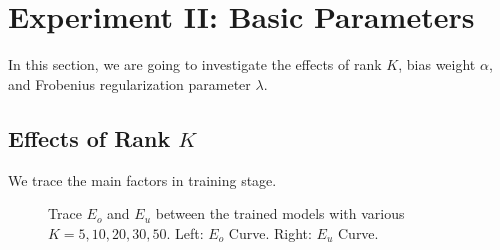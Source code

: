 \documentclass{article} %
\begin{document}
\section{Experiment II: Basic Parameters} %
In this section, we are going to investigate the effects of rank $K$, bias
weight $\alpha$, and Frobenius regularization parameter $\lambda$.

\subsection{Effects of Rank $K$}
We trace the main factors in training stage.
\begin{figure}[hp]
    \centering
    \captionsetup{justification=centering}
    \caption{Trace $E_o$ and $E_u$ between the trained models with various
        $K=5,10,20,30,50$. \newline
        Left: $E_o$ Curve. Right: $E_u$ Curve. } 
    \label{EffectK:Eo_Eu}
\end{figure}
\end{document}
